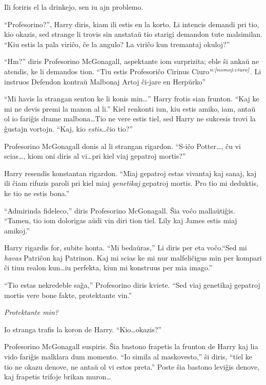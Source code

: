 Ili foriris el la drinkejo, sen iu ajn problemo.

``Profesorino?'', Harry diris, kiam ili estis en la korto. Li intencis
demandi pri tio, kio okazis, sed strange li trovis sin anstataŭ tio
starigi demandon tute malsimilan. ``Kiu estis la pala viriĉo, ĉe la
angulo? La viriĉo kun tremantaj okuloj?''

``Hm?'' diris Profesorino McGonagall, aspektante iom surprizita; eble
ŝi ankaŭ ne atendis, ke li demandos tion. ``Tiu estis Profesoriĉo
Cirinus Ciuro$^{\textit{n:\ref{nomoj:ciuro}}}$. Li instruos Defendon kontraŭ
Malbonaj Artoj ĉi-jare en Herpŭrko''

``Mi havis la strangan senton ke li konis min\ldots'' Harry frotis
sian frunton. ``Kaj ke mi ne devis premi la manon al li.'' Kiel
renkonti iun, kiu estis amiko, iam, antaŭ ol io fariĝis drame
malbona\ldots Tio ne vere estis tiel, sed Harry ne sukcesis trovi la
ĝustajn vortojn. ``Kaj, kio \emph{estis}\ldots ĉio tio?''

Profesorino McGonagall donis al li strangan rigardon. ``S-iĉo
Potter\ldots, ĉu vi scias\ldots, kiom oni diris al vi\ldots pri kiel
viaj gepatroj mortis?''

Harry resendis konstantan rigardon. ``Miaj gepatroj estas vivantaj kaj
sanaj, kaj ili ĉiam rifuzis paroli pri kiel miaj \emph{genetikaj}
gepatroj mortis. Pro tio mi deduktis, ke tio ne estis bona.''

``Admirinda fideleco,'' diris Profesorino McGonagall. Ŝia voĉo
mallaŭtiĝis. ``Tamen, tio iom dolorigas aŭdi vin diri tion tiel. Lily
kaj James estis miaj amikoj.''

Harry rigardis for, subite honta. ``Mi bedaŭras,'' Li diris per
eta voĉo.``Sed mi \emph{havas} Patriĉon kaj Patrinon. Kaj mi scias ke mi
nur malfeliĉigus min per kompari ĉi tiun realon kun\ldots iu
perfekta, kiun mi konstruus per mia imago.''

``Tio estas nekredeble saĝa,'' Profesorino diris kviete. ``Sed viaj
genetikaj gepatroj mortis vere bone fakte, protektante vin.''

\emph{Protektante min?}

Io stranga trafis la koron de Harry. ``Kio\ldots okazis?''

Profesorino McGonagall suspiris. Ŝia bastono frapetis la frunton de
Harry kaj lia vido fariĝis malklara dum momento. ``Io simila al
maskovesto,'' ŝi diris, ``tiel ke tio ne okazu denove, ne antaŭ ol vi
estos preta.''  Poste ŝia bastono leviĝis denove, kaj frapetis trifoje
brikan muron\ldots

